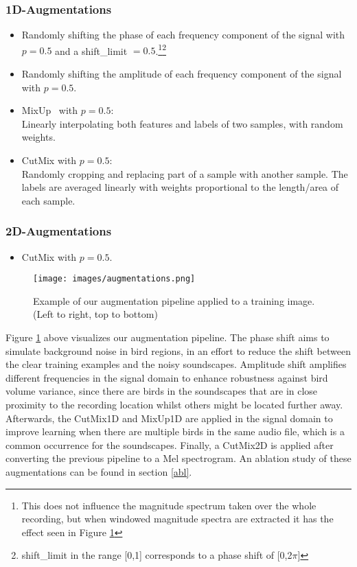 \documentclass[
]{ceurart}
\begin{document}
\subsubsection*{1D-Augmentations}
\begin{itemize}
    \item Randomly shifting the phase of each frequency component of the signal with $p=0.5$ and a shift\_limit $=0.5$.\footnote{This does not influence the magnitude spectrum taken over the whole recording, but when windowed magnitude spectra are extracted it has the effect seen in Figure \ref{fig:augmentations}}\footnote{shift\_limit in the range [0,1] corresponds to a phase shift of [0,2$\pi$]}
    \item Randomly shifting the amplitude of each frequency component of the signal with $p=0.5$.
    \item MixUp \cite{zhang2018mixup}\ with $p=0.5$: \\
    Linearly interpolating both features and labels of two samples, with random weights.
    \item CutMix \cite{yun2019cutmix} with $p=0.5$:\\
    Randomly cropping and replacing part of a sample with another sample. The labels are averaged linearly with weights proportional to the length/area of each sample.
\end{itemize}
\subsubsection*{2D-Augmentations}
\begin{itemize}
    \item CutMix with $p=0.5$.
\end{itemize}

\begin{figure}[h]
    \centering
    \texttt{[image: images/augmentations.png]}
    \caption{Example of our augmentation pipeline applied to a training image. (Left to right, top to bottom)}
    \label{fig:augmentations}
\end{figure}
Figure \ref{fig:augmentations} above visualizes our augmentation pipeline. The phase shift aims to simulate background noise in bird regions, in an effort to reduce the shift between the clear training examples and the noisy soundscapes. Amplitude shift amplifies different frequencies in the signal domain to enhance robustness against bird volume variance, since there are birds in the soundscapes that are in close proximity to the recording location whilst others might be located further away. Afterwards, the CutMix1D and MixUp1D are applied in the signal domain to improve learning when there are multiple birds in the same audio file, which is a common occurrence for the soundscapes. Finally, a CutMix2D is applied after converting the previous pipeline to a Mel spectrogram. An ablation study of these augmentations can be found in section \ref{abl}.
\end{document}
